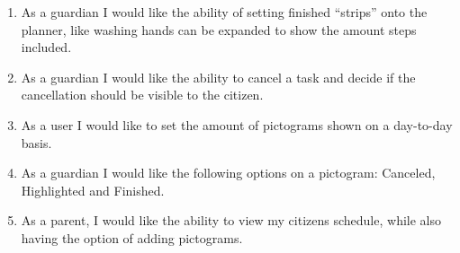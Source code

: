 \begin{enumerate}
  \item As a guardian I would like the ability of setting finished “strips” onto
the planner, like washing hands can be expanded to show the amount steps included.
  \item As a guardian I would like the ability to cancel a task and decide if
the cancellation should be visible to the citizen.
  \item As a user I would like to set the amount of pictograms shown on a
day-to-day basis.
  \item As a guardian I would like the following options on a pictogram:
Canceled, Highlighted and Finished.
  \item As a parent, I would like the ability to view my citizens schedule,
while also having the option of adding pictograms.
\end{enumerate}